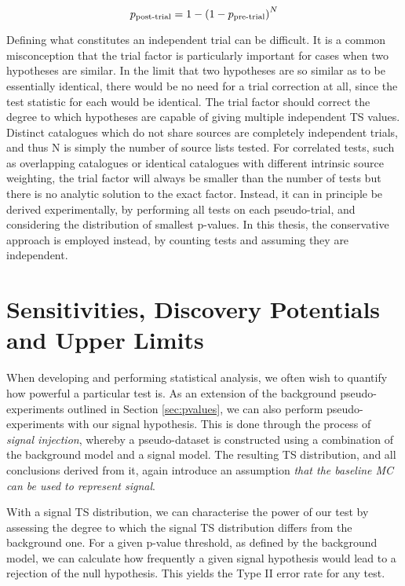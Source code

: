 \begin{equation}
p_{\textup{post-trial}} = 1 - \left( 1 - p_{\textup{pre-trial}} \right)^{N}
\label{eq:trial_correction}
\end{equation}

Defining what constitutes an independent trial can be difficult. It is a common misconception that the trial factor is particularly important for cases when two hypotheses are similar. In the limit that two hypotheses are so similar as to be essentially identical, there would be no need for a trial correction at all, since the test statistic for each would be identical. The trial factor should correct the degree to which hypotheses are capable of giving multiple independent TS values. Distinct catalogues which do not share sources are completely independent trials, and thus N is simply the number of source lists tested. For correlated tests, such as overlapping catalogues or identical catalogues with different intrinsic source weighting, the trial factor will always be smaller than the number of tests but there is no analytic solution to the exact factor. Instead, it can in principle be derived experimentally, by performing all tests on each pseudo-trial, and considering the distribution of smallest p-values. In this thesis, the conservative approach is employed instead, by counting tests and assuming they are independent.

\section{Sensitivities, Discovery Potentials and Upper Limits}
\label{sec:sens_uls}

When developing and performing statistical analysis, we often wish to quantify how powerful a particular test is. As an extension of the background pseudo-experiments outlined in Section \ref{sec:pvalues}, we can also perform pseudo-experiments with our signal hypothesis. This is done through the process of \emph{signal injection}, whereby a pseudo-dataset is constructed using a combination of the background model and a signal model. The resulting TS distribution, and all conclusions derived from it, again introduce an assumption \emph{that the baseline MC can be used to represent signal}. 

With a signal TS distribution, we can characterise the power of our test by assessing the degree to which the signal TS distribution differs from the background one. For a given p-value threshold, as defined by the background model, we can calculate how frequently a given signal hypothesis would lead to a rejection of the null hypothesis. This yields the Type II error rate for any test.

